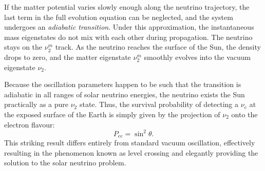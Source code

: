 If the matter potential varies slowly enough along the neutrino trajectory, the last term in the full evolution equation can be neglected, and the system undergoes an \textit{adiabatic transition}. Under this approximation, the instantaneous mass eigenstates do not mix with each other during propagation. The neutrino stays on the $\nu_2^m$ track. As the neutrino reaches the surface of the Sun, the density drops to zero, and the matter eigenstate $\nu_2^m$ smoothly evolves into the vacuum eigenstate $\nu_2$.

Because the oscillation parameters happen to be such that the transition is adiabatic in all ranges of solar neutrino energies, the neutrino exists the Sun practically as a pure $\nu_2$ state. Thus, the survival probability of detecting a $\nu_e$ at the exposed surface of the Earth is simply given by the projection of $\nu_2$ onto the electron flavour:
\begin{equation}
    \label{eq:adiabatic_survival_prob}
    P_{ee} = \sin^2 \theta.
\end{equation}
This striking result differs entirely from standard vacuum oscillation, effectively resulting in the phenomenon known as level crossing and elegantly providing the solution to the solar neutrino problem.